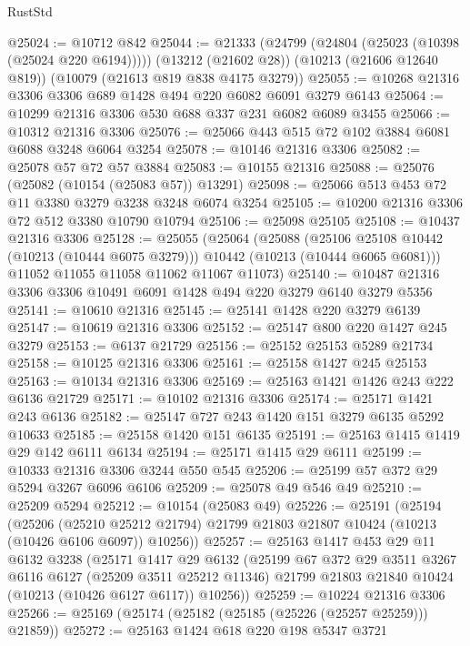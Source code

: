 \begin{lexlean}{RustStd}
\begin{coremodule}
{\begin{coremodule}
{{{{{{{{{{{{{{{{{{{{{{{{{{@25024 := @10712 @842
@25044 := @21333
    (@24799 (@24804 (@25023 (@10398 (@25024 @220 @6194)))))
    (@13212 (@21602 @28))
    (@10213 (@21606 @12640 @819))
    (@10079 (@21613 @819 @838 @4175 @3279))
@25055 := @10268 @21316 @3306 @3306 @689 @1428 @494 @220 @6082 @6091 @3279 @6143
@25064 := @10299 @21316 @3306 @530 @688 @337 @231 @6082 @6089 @3455
@25066 := @10312 @21316 @3306
@25076 := @25066 @443 @515 @72 @102 @3884 @6081 @6088 @3248 @6064 @3254
@25078 := @10146 @21316 @3306
@25082 := @25078 @57 @72 @57 @3884
@25083 := @10155 @21316
@25088 := @25076 (@25082 (@10154 (@25083 @57)) @13291)
@25098 := @25066 @513 @453 @72 @11 @3380 @3279 @3238 @3248 @6074 @3254
@25105 := @10200 @21316 @3306 @72 @512 @3380 @10790 @10794
@25106 := @25098 @25105
@25108 := @10437 @21316 @3306
@25128 := @25055
    (@25064
      (@25088
        (@25106 @25108 @10442 (@10213 (@10444 @6075 @3279)))
        @10442
        (@10213 (@10444 @6065 @6081)))
      @11052
      @11055
      @11058
      @11062
      @11067
      @11073)
@25140 := @10487 @21316 @3306 @3306 @10491 @6091 @1428 @494 @220 @3279 @6140 @3279 @5356
@25141 := @10610 @21316
@25145 := @25141 @1428 @220 @3279 @6139
@25147 := @10619 @21316 @3306
@25152 := @25147 @800 @220 @1427 @245 @3279
@25153 := @6137 @21729
@25156 := @25152 @25153 @5289 @21734
@25158 := @10125 @21316 @3306
@25161 := @25158 @1427 @245 @25153
@25163 := @10134 @21316 @3306
@25169 := @25163 @1421 @1426 @243 @222 @6136 @21729
@25171 := @10102 @21316 @3306
@25174 := @25171 @1421 @243 @6136
@25182 := @25147 @727 @243 @1420 @151 @3279 @6135 @5292 @10633
@25185 := @25158 @1420 @151 @6135
@25191 := @25163 @1415 @1419 @29 @142 @6111 @6134
@25194 := @25171 @1415 @29 @6111
@25199 := @10333 @21316 @3306 @3244 @550 @545
@25206 := @25199 @57 @372 @29 @5294 @3267 @6096 @6106
@25209 := @25078 @49 @546 @49
@25210 := @25209 @5294
@25212 := @10154 (@25083 @49)
@25226 := @25191
    (@25194
      (@25206
        (@25210 @25212 @21794)
        @21799
        @21803
        @21807
        @10424
        (@10213 (@10426 @6106 @6097))
        @10256))
@25257 := @25163
    @1417
    @453
    @29
    @11
    @6132
    @3238
    (@25171
      @1417
      @29
      @6132
      (@25199
        @67
        @372
        @29
        @3511
        @3267
        @6116
        @6127
        (@25209 @3511 @25212 @11346)
        @21799
        @21803
        @21840
        @10424
        (@10213 (@10426 @6127 @6117))
        @10256))
@25259 := @10224 @21316 @3306
@25266 := @25169 (@25174 (@25182 (@25185 (@25226 (@25257 @25259))) @21859))
@25272 := @25163 @1424 @618 @220 @198 @5347 @3721
}}}}}}}}}}}}}}}}}}}}}}}}}}
\end{coremodule}}
\end{coremodule}
\end{lexlean}

